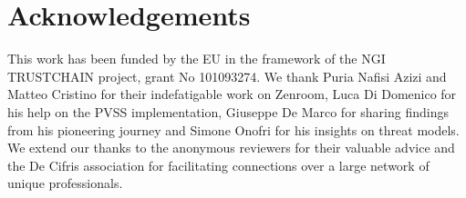 \section{Acknowledgements}
This work has been funded by the EU in the framework of the NGI
TRUSTCHAIN project, grant No 101093274. We thank Puria Nafisi Azizi
and Matteo Cristino for their indefatigable work on Zenroom, Luca Di
Domenico for his help on the PVSS implementation, Giuseppe De Marco
for sharing findings from his pioneering journey and Simone Onofri for
his insights on threat models. We extend our thanks to the anonymous
reviewers for their valuable advice and the De Cifris association for
facilitating connections over a large network of unique professionals.






